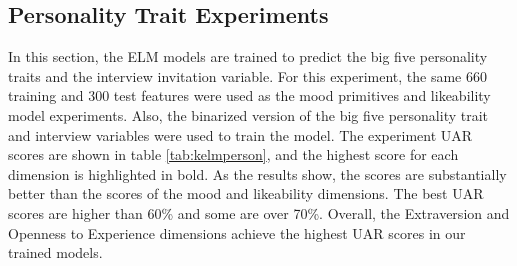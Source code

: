 \subsection{Personality Trait Experiments}\label{subsection:personexp}

In this section, the ELM models are trained to predict the big five personality traits and the interview invitation variable. For this experiment, the same 660 training and 300 test features were used as the mood primitives and likeability model experiments. Also, the binarized version of the big five personality trait and interview variables were used to train the model. The experiment UAR scores are shown in table \ref{tab:kelmperson}, and the highest score for each dimension is highlighted in bold. As the results show, the scores are substantially better than the scores of the mood and likeability dimensions. The best UAR scores are higher than 60\% and some are over 70\%. Overall, the Extraversion and Openness to Experience dimensions achieve the highest UAR scores in our trained models. 

